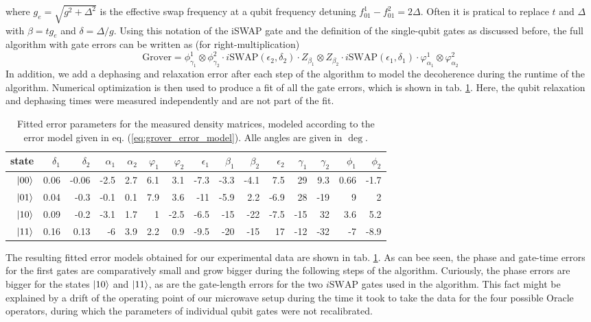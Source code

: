 where $g_e = \sqrt{g^2+\Delta^2}$ is the effective swap frequency at a qubit frequency detuning $f_{01}^1-f_{01}^2 = 2\Delta$. Often it is pratical to replace $t$ and $\Delta$ with $\beta = t g_{e}$ and $\delta = \Delta / g$. Using this notation of the iSWAP gate and the definition of the single-qubit gates as discussed before, the full algorithm with gate errors can be written as (for right-multiplication)
%
\begin{equation}
\mathrm{Grover} = \phi_{\gamma_1}^1\otimes \phi_{\gamma_2}^2\cdot i\mathrm{SWAP}(\epsilon_2,\delta_2)\cdot Z_{\beta_1}\otimes Z_{\beta_2}\cdot i\mathrm{SWAP}(\epsilon_1,\delta_1)\cdot\varphi_{\alpha_1}^1\otimes \varphi_{\alpha_2}^2 \label{eq:grover_error_model}
\end{equation}
%
In addition, we add a dephasing and relaxation error after each step of the algorithm to model the decoherence during the runtime of the algorithm. Numerical optimization is then used to produce a fit of all the gate errors, which is shown in tab. \ref{tab:grover_error_parameters}. Here, the qubit relaxation and dephasing times were measured independently and are not part of the fit.

\begin{table}[ht!]
\centering
\footnotesize{
\begin{tabular}{r|rrrrrrrrrrrrrr}
state & $\delta_1$ & $\delta_2$ & $\alpha_1$ & $\alpha_2$ & $\varphi_1$ & $\varphi_2$ & $\epsilon_1$ & $\beta_1$ & $\beta_2$ & $\epsilon_2$ & $\gamma_1$ & $\gamma_2$ & $\phi_1$ & $\phi_2$ \\ \hline
$\left| 00 \right>$ & 0.06 & -0.06 & -2.5 & 2.7 & 6.1 & 3.1 & -7.3 & -3.3 & -4.1 & 7.5 & 29 & 9.3 & 0.66 & -1.7
 \\
$\left| 01 \right>$ & 0.04 & -0.3 & -0.1 & 0.1 & 7.9 & 3.6 & -11 & -5.9 & 2.2 & -6.9 & 28 & -19 &  9 &  2
 \\
$\left| 10 \right>$ & 0.09 & -0.2 & -3.1 & 1.7 &  1 & -2.5 & -6.5 & -15 & -22 & -7.5 & -15 & 32 & 3.6 & 5.2
\\
$\left| 11 \right>$ & 0.16 & 0.13 & -6 & 3.9 & 2.2 & 0.9 & -9.5 & -20 & -15 & 17 & -12 & -32 & -7 & -8.9
\end{tabular}
}
\caption[Fitted gate error parameters of the Grover algorithm]{Fitted error parameters for the measured density matrices, modeled according to the error model given in eq. (\ref{eq:grover_error_model}). Alle angles are given in $\deg$.}
\label{tab:grover_error_parameters}
\end{table}

The resulting fitted error models obtained for our experimental data are shown in tab. \ref{tab:grover_error_parameters}. As can bee seen, the phase and gate-time errors for the first gates are comparatively small and grow bigger during the following steps of the algorithm. Curiously, the phase errors are bigger for the states $\left| 10 \right>$ and $\left| 11 \right>$, as are the gate-length errors for the two $i\mathrm{SWAP}$ gates used in the algorithm. This fact might be explained by a drift of the operating point of our microwave setup during the time it took to take the data for the four possible Oracle operators, during which the parameters of individual qubit gates were not recalibrated.

